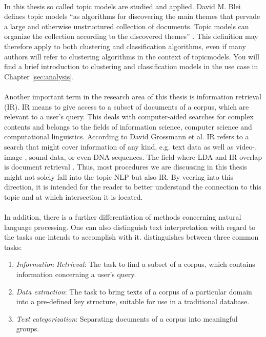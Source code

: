 \documentclass[11pt,a4paper]{article}
\begin{document}
\ \\
In this thesis so called topic models are studied and applied. David M. Blei defines topic models ``as algorithms for discovering the main themes that pervade a large and otherwise unstructured collection of documents. Topic models can organize the collection according to the discovered themes” \cite{Blei2012}. This definition may therefore apply to both clustering and classification algorithms, even if many authors will refer to clustering algorithms in the context of topicmodels. You will find a brief introduction to clustering and classification models in the use case in Chapter \ref{sec:analysis}.\\
\ \\
Another important term in the research area of this thesis is information retrieval (IR). IR means to give access to a subset of documents of a corpus, which are relevant to a user’s query. This deals with computer-aided searches for complex contents and belongs to the fields of information science, computer science and computational linguistics. According to David Grossmann et al. IR refers to a search that might cover information of any kind, e.g. text data as well as video-, image-, sound data, or even DNA sequences. The field where LDA and IR overlap is document retrieval \cite{Grossmann2004}. Thus, most procedures we are discussing in this thesis might not solely fall into the topic NLP but also IR. By veering into this direction, it is intended for the reader to better understand the connection to this topic and at which intersection it is located. \\
\ \\
In addition, there is a further differentiation of methods concerning natural language processing. One can also distinguish text interpretation with regard to the tasks one intends to accomplish with it. \cite{Jacobs1993} distinguishes between three common tasks:
\begin{enumerate}
	\item \textit{Information Retrieval}: The task to find a subset of a corpus, which contains information concerning a user’s query.

	\item \textit{Data extraction}: The task to bring texts of a corpus of a particular domain into a pre-defined key structure, suitable for use in a traditional database.

	\item \textit{Text categorization}: Separating documents of a corpus into meaningful groups.
\end{enumerate}
\end{document}
